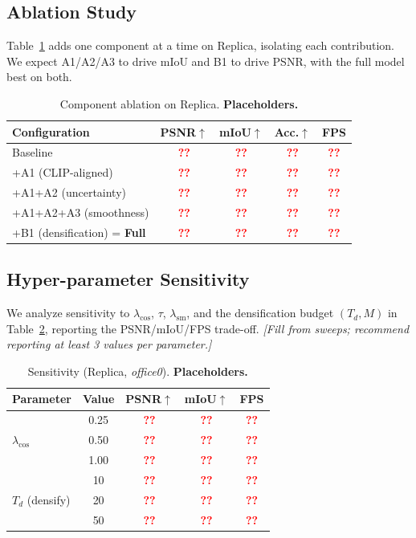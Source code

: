 \documentclass[10pt, journal]{IEEEtran}
\newcommand{\tofill}{\textcolor{red}{\textbf{??}}}
\newcommand{\best}[1]{\textbf{#1}}
\begin{document}
\subsection{Ablation Study}
Table~\ref{tab:ablation} adds one component at a time on Replica, isolating each
contribution. We expect A1/A2/A3 to drive mIoU and B1 to drive PSNR, with the full
model best on both.

\begin{table}[t]
\centering
\caption{Component ablation on Replica. \textbf{Placeholders.}}
\label{tab:ablation}
\begin{tabular}{lcccc}
\toprule
Configuration & PSNR$\uparrow$ & mIoU$\uparrow$ & Acc.$\uparrow$ & FPS \\
\midrule
Baseline                       & \tofill & \tofill & \tofill & \tofill \\
\;+A1 (CLIP-aligned)           & \tofill & \tofill & \tofill & \tofill \\
\;+A1+A2 (uncertainty)         & \tofill & \tofill & \tofill & \tofill \\
\;+A1+A2+A3 (smoothness)       & \tofill & \tofill & \tofill & \tofill \\
\;+B1 (densification) = \textbf{Full} & \best{\tofill} & \best{\tofill} & \best{\tofill} & \tofill \\
\bottomrule
\end{tabular}
\end{table}

\subsection{Hyper-parameter Sensitivity}
We analyze sensitivity to $\lambda_{\cos}$, $\tau$, $\lambda_{\text{sm}}$, and the
densification budget $(T_d, M)$ in Table~\ref{tab:sens}, reporting the
PSNR/mIoU/FPS trade-off. \emph{[Fill from sweeps; recommend reporting at least 3
values per parameter.]}

\begin{table}[t]
\centering
\caption{Sensitivity (Replica, \textit{office0}). \textbf{Placeholders.}}
\label{tab:sens}
\begin{tabular}{lcccc}
\toprule
Parameter & Value & PSNR$\uparrow$ & mIoU$\uparrow$ & FPS \\
\midrule
\multirow{3}{*}{$\lambda_{\cos}$} & 0.25 & \tofill & \tofill & \tofill \\
                                  & 0.50 & \tofill & \tofill & \tofill \\
                                  & 1.00 & \tofill & \tofill & \tofill \\
\midrule
\multirow{3}{*}{$T_d$ (densify)}  & 10 & \tofill & \tofill & \tofill \\
                                  & 20 & \tofill & \tofill & \tofill \\
                                  & 50 & \tofill & \tofill & \tofill \\
\bottomrule
\end{tabular}
\end{table}
\end{document}

